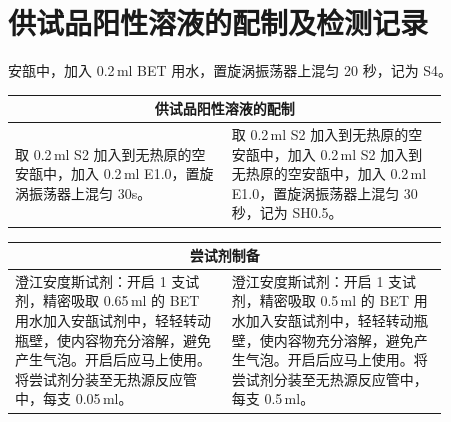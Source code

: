 \documentclass[UTF8,10pt,a4paper,fontset=fandol]{ctexart}
\newcommand{\fieldvalue}[1]{#1}
\newcommand{\handwritten}[1]{#1}
\begin{document}
\newpage

\section*{供试品阳性溶液的配制及检测记录}

安瓿中，加入 0.2\,ml BET 用水，置旋涡振荡器上混匀
\fieldvalue{\handwritten{20}} 秒，记为 S4。

\begin{center}
\begin{tabular}{|p{0.43\linewidth}|p{0.43\linewidth}|}
\hline
\multicolumn{2}{|c|}{供试品阳性溶液的配制}\\
\hline
取 0.2\,ml S2 加入到无热原的空安瓿中，加入 0.2\,ml E1.0，置旋涡振荡器上混匀 30s。
&
取 0.2\,ml S2 加入到无热原的空安瓿中，加入
\fieldvalue{\handwritten{0.2}}\,ml S2 加入到无热原的空安瓿中，加入
\fieldvalue{\handwritten{0.2}}\,ml E1.0，置旋涡振荡器上混匀
\fieldvalue{\handwritten{30}} 秒，记为 SH0.5。
\\
\hline
\end{tabular}
\end{center}

\begin{center}
\begin{tabular}{|p{0.43\linewidth}|p{0.43\linewidth}|}
\hline
\multicolumn{2}{|c|}{尝试剂制备}\\
\hline
澄江安度斯试剂：开启 1 支试剂，精密吸取 0.65\,ml 的 BET 用水加入安瓿试剂中，轻轻转动瓶壁，使内容物充分溶解，避免产生气泡。开启后应马上使用。将尝试剂分装至无热源反应管中，每支 0.05\,ml。
&
澄江安度斯试剂：开启 1 支试剂，精密吸取
\fieldvalue{\handwritten{0.5}}\,ml 的 BET 用水加入安瓿试剂中，轻轻转动瓶壁，使内容物充分溶解，避免产生气泡。开启后应马上使用。将尝试剂分装至无热源反应管中，每支
\fieldvalue{\handwritten{0.5}}\,ml。
\\
\hline
\end{tabular}
\end{center}
\end{document}
